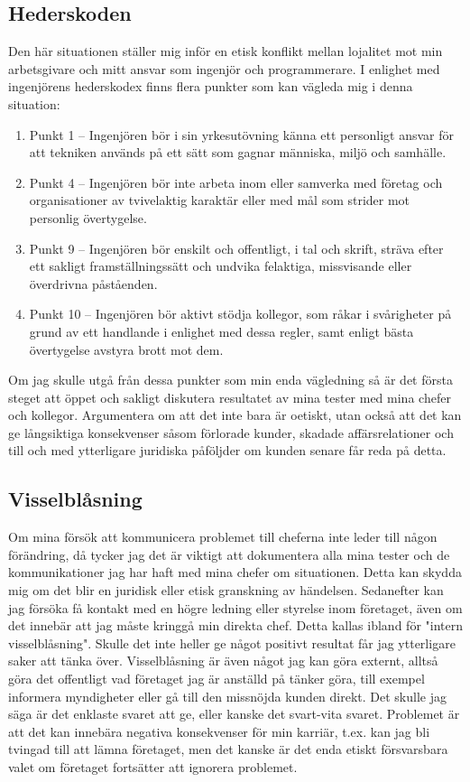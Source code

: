 \documentclass[a4paper,12pt]{article}
\begin{document}
\subsection*{Hederskoden}
Den här situationen ställer mig inför en etisk konflikt mellan lojalitet mot
min arbetsgivare och mitt ansvar som ingenjör och programmerare. I enlighet med
ingenjörens hederskodex \cite{heder} finns flera punkter som kan vägleda mig i
denna situation:
\begin{enumerate}
    \item Punkt 1 – Ingenjören bör i sin yrkesutövning känna ett personligt
          ansvar för att tekniken används på ett sätt som gagnar människa, miljö och
          samhälle.
    \item Punkt 4 – Ingenjören bör inte arbeta inom eller samverka med företag
          och organisationer av tvivelaktig karaktär eller med mål som strider mot
          personlig övertygelse. 
    \item Punkt 9 – Ingenjören bör enskilt och offentligt, i tal och skrift,
          sträva efter ett sakligt framställningssätt och undvika felaktiga,
          missvisande eller överdrivna påståenden.
    \item Punkt 10 – Ingenjören bör aktivt stödja kollegor, som råkar i
          svårigheter på grund av ett handlande i enlighet med dessa regler, samt
          enligt bästa övertygelse avstyra brott mot dem.
\end{enumerate}
Om jag skulle utgå från dessa punkter som min enda vägledning så är det första
steget att öppet och sakligt diskutera resultatet av mina tester med mina
chefer och kollegor. Argumentera om att det inte bara är oetiskt, utan också
att det kan ge långsiktiga konsekvenser såsom förlorade kunder, skadade
affärsrelationer och till och med ytterligare juridiska påföljder om kunden
senare får reda på detta.
%
\subsection*{Visselblåsning}
Om mina försök att kommunicera problemet till cheferna inte leder till någon
förändring, då tycker jag det är viktigt att dokumentera alla mina tester och
de kommunikationer jag har haft med mina chefer om situationen.  Detta kan
skydda mig om det blir en juridisk eller etisk granskning av händelsen.
Sedanefter kan jag försöka få kontakt med en högre ledning eller styrelse inom
företaget, även om det innebär att jag måste kringgå min direkta chef. Detta
kallas ibland för "intern visselblåsning". Skulle det inte heller ge något
positivt resultat får jag ytterligare saker att tänka över. Visselblåsning är
även något jag kan göra externt, alltså göra det offentligt vad företaget jag
är anställd på tänker göra, till exempel informera myndigheter eller gå till
den missnöjda kunden direkt. Det skulle jag säga är det enklaste svaret att ge,
eller kanske det svart-vita svaret.  Problemet är att det kan innebära negativa
konsekvenser för min karriär, t.ex. kan jag bli tvingad till att lämna
företaget, men det kanske är det enda etiskt försvarsbara valet om företaget
fortsätter att ignorera problemet.
%
\end{document}
